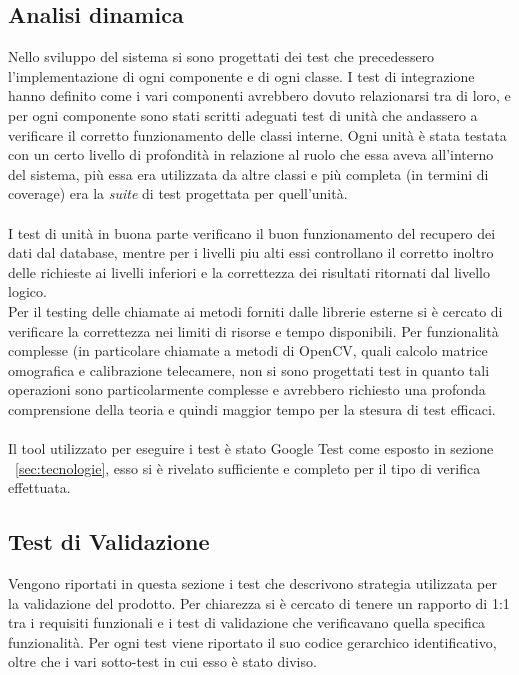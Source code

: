 \documentclass[a4paper,13pt,twoside]{article}
\begin{document}
\subsection{Analisi dinamica}
Nello sviluppo del sistema si sono progettati dei test che precedessero l'implementazione di ogni componente e di ogni classe. I test di integrazione hanno definito come i vari componenti avrebbero dovuto relazionarsi tra di loro, e per ogni componente sono stati scritti adeguati test di unità che andassero a verificare il corretto funzionamento delle classi interne. Ogni unità è stata testata con un certo livello di profondità in relazione al ruolo che essa aveva all'interno del sistema, più essa era utilizzata da altre classi e più completa (in termini di coverage) era la \textit{suite} di test progettata per quell'unità. \\ \\
I test di unità in buona parte verificano il buon funzionamento del recupero dei dati dal database, mentre per i livelli piu alti essi controllano il corretto inoltro delle richieste ai livelli inferiori e la correttezza dei risultati ritornati dal livello logico. \\
Per il testing delle chiamate ai metodi forniti dalle librerie esterne si è cercato di verificare la correttezza nei limiti di risorse e tempo disponibili. Per funzionalità complesse (in particolare chiamate a metodi di OpenCV, quali calcolo matrice omografica e calibrazione telecamere, non si sono progettati test in quanto tali operazioni sono particolarmente complesse e avrebbero richiesto una profonda comprensione della teoria e quindi maggior tempo per la stesura di test efficaci. \\ \\
Il tool utilizzato per eseguire i test è stato Google Test come esposto in sezione ~\ref{sec:tecnologie}, esso si è rivelato sufficiente e completo per il tipo di verifica effettuata.
\subsection{Test di Validazione}
Vengono riportati in questa sezione i test che descrivono strategia utilizzata per la validazione del prodotto. Per chiarezza si è cercato di tenere un rapporto di 1:1 tra i requisiti funzionali e i test di validazione che verificavano quella specifica funzionalità. Per ogni test viene riportato il suo codice gerarchico identificativo, oltre che i vari sotto-test in cui esso è stato diviso.
\end{document}
